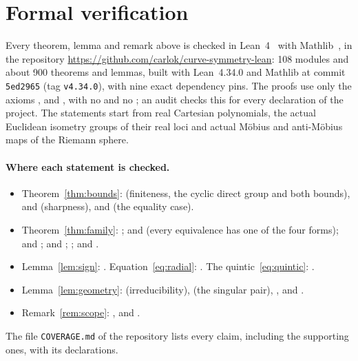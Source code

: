 \documentclass[11pt,a4paper]{article}
\theoremstyle{definition}
\begin{document}
\appendix
\section{Formal verification}\label{app:lean}

Every theorem, lemma and remark above is checked in Lean~4~\cite{Lean4} with
Mathlib~\cite{Mathlib}, in the repository
\url{https://github.com/carlok/curve-symmetry-lean}: 108 modules and about 900
theorems and lemmas, built with Lean~4.34.0 and Mathlib at commit
\texttt{5ed2965} (tag \texttt{v4.34.0}), with nine exact dependency pins. The
proofs use only the axioms ,  and
, with no  and no ; an audit
checks this for every declaration of the project. The statements start from
real Cartesian polynomials, the actual Euclidean isometry groups of their real
loci and actual M\"obius and anti-M\"obius maps of the Riemann sphere.

\paragraph{Where each statement is checked.}
\begin{itemize}[before=\raggedright]
\item Theorem~\ref{thm:bounds}:  (finiteness, the
  cyclic direct group and both bounds),  and
   (sharpness), 
  and  (the equality case).
\item Theorem~\ref{thm:family}: ;
   and  (every
  equivalence has one of the four forms); 
  and ; 
  and ; ;
   and
  .
\item Lemma~\ref{lem:sign}: . Equation~\eqref{eq:radial}:
  . The quintic~\eqref{eq:quintic}:
  .
\item Lemma~\ref{lem:geometry}:  (irreducibility),
   (the singular pair),
  ,  and
  .
\item Remark~\ref{rem:scope}: ,
   and
  .
\end{itemize}
The file \texttt{COVERAGE.md} of the repository lists every claim, including
the supporting ones, with its declarations.
\end{document}

